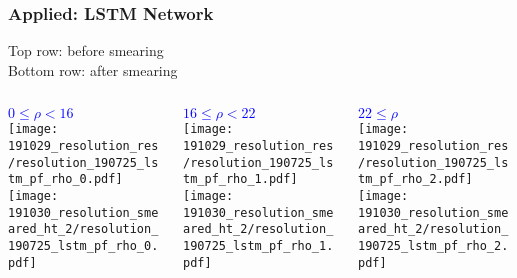 \documentclass{beamer}
\begin{document}
\begin{frame}
  \frametitle{Applied: LSTM Network}

  Top row: before smearing \\
  Bottom row: after smearing \\
  \vfill

  \begin{columns}
    \begin{column}{0.3\linewidth}
      \centering
      \textcolor{blue}{$0 \leq \rho < 16$} \\
      \texttt{[image: 191029\_resolution\_res/resolution\_190725\_lstm\_pf\_rho\_0.pdf]} \\
      \texttt{[image: 191030\_resolution\_smeared\_ht\_2/resolution\_190725\_lstm\_pf\_rho\_0.pdf]}
    \end{column}
    \begin{column}{0.3\linewidth}
      \centering
      \textcolor{blue}{$16 \leq \rho < 22$} \\
      \texttt{[image: 191029\_resolution\_res/resolution\_190725\_lstm\_pf\_rho\_1.pdf]} \\
      \texttt{[image: 191030\_resolution\_smeared\_ht\_2/resolution\_190725\_lstm\_pf\_rho\_1.pdf]}
    \end{column}
    \begin{column}{0.3\linewidth}
      \centering
      \textcolor{blue}{$22 \leq \rho$} \\
      \texttt{[image: 191029\_resolution\_res/resolution\_190725\_lstm\_pf\_rho\_2.pdf]} \\
      \texttt{[image: 191030\_resolution\_smeared\_ht\_2/resolution\_190725\_lstm\_pf\_rho\_2.pdf]}
    \end{column}
  \end{columns}

\end{frame}
\end{document}
